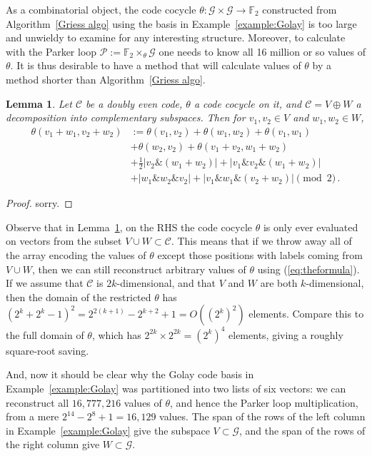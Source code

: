 \documentclass{article}
\theoremstyle{plain}
\newtheorem{lemma}{Lemma}
\theoremstyle{definition}
\def \cC {\mathcal{C}}
\def \cG {\mathcal{G}}
\def \cP {\mathcal{P}}
\def \FF {\mathbb{F}}
\def\And{\mathbin{\&}}
\def\Plus{+}
\begin{document}
As a combinatorial object, the code cocycle $\theta\colon \cG \times \cG\to \FF_2$ constructed from Algorithm~\ref{Griess algo} using the basis in Example~\ref{example:Golay} is too large and unwieldy to examine for any interesting structure. 
Moreover, to calculate with the Parker loop $\cP := \FF_2\times_\theta \cG$ one needs to know all 16 million or so values of $\theta$.
It is thus desirable to have a method that will calculate values of $\theta$ by a method shorter than Algorithm~\ref{Griess algo}.

\begin{lemma}\label{lemma:formula lemma}
Let $\cC$ be a doubly even code, $\theta$ a code cocycle on it, and $\cC = V\oplus W$ a decomposition into complementary subspaces.
Then for $v_1,v_2\in V$ and $w_1,w_2\in W$,
\begin{align}\label{eq:theformula}
	\theta(v_1\Plus w_1,v_2\Plus w_2)	
		& := \theta(v_1,v_2)  + \theta(w_1,w_2) + \theta(v_1,w_1)  \\
		&+ \theta(w_2,v_2) + \theta(v_1\Plus v_2,w_1\Plus w_2) \nonumber \\
							& + \tfrac12|v_2\And(w_1\Plus w_2)| + |v_1\And v_2 \And (w_1\Plus w_2)| \nonumber \\
							&+|w_1\And w_2 \And v_2| + \left|v_1\And w_1 \And (v_2 \Plus  w_2)\right| \pmod 2\,. \nonumber
\end{align}
\end{lemma}

\begin{proof}
sorry.
\end{proof}

Observe that in Lemma~\ref{lemma:formula lemma}, on the RHS the code cocycle $\theta$ is only ever evaluated on vectors from the subset $V \cup W \subset \cC$.
This means that if we throw away all of the array encoding the values of $\theta$ except those positions with labels coming from $V\cup W$, then we can still reconstruct arbitrary values of $\theta$ using (\ref{eq:theformula}).
If we assume that $\cC$ is $2k$-dimensional, and that $V$ and $W$ are both $k$-dimensional, then the domain of the restricted $\theta$ has $(2^k+2^k - 1)^2 = 2^{2(k+1)} - 2^{k+2} + 1 = O((2^k)^2)$ elements. 
Compare this to the full domain of $\theta$, which has $2^{2k}\times 2^{2k} = (2^k)^4$ elements, giving a roughly square-root saving.

And, now it should be clear why the Golay code basis in Example~\ref{example:Golay} was partitioned into two lists of six vectors: we can reconstruct all $16,777,216$ values of $\theta$, and hence the Parker loop multiplication, from a mere $2^{14} - 2^8 + 1 = 16,129$ values.
The span of the rows of the left column in Example~\ref{example:Golay} give the subspace $V\subset \cG$, and the span of the rows of the right column give $W\subset \cG$.
\end{document}
